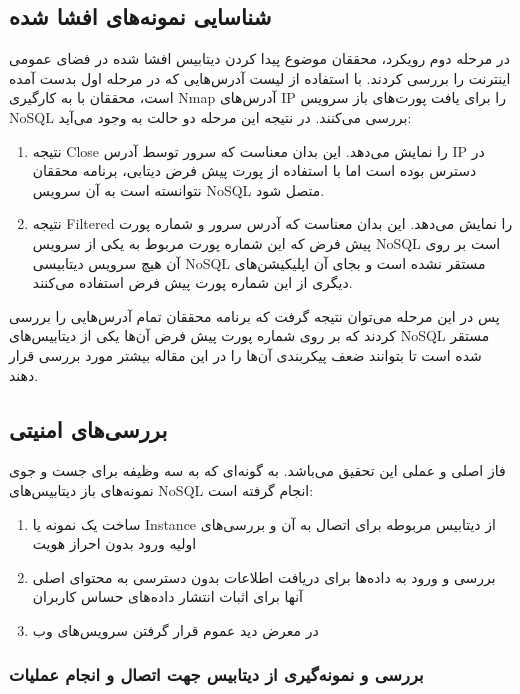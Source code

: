 \documentclass[10pt, a4paper]{article}
\begin{document}
\subsection{شناسایی نمونه‌های افشا شده}

در مرحله دوم رویکرد، محققان موضوع پیدا کردن دیتابیس افشا شده در فضای عمومی
اینترنت را بررسی کردند. با استفاده از لیست آدرس‌هایی که در مرحله اول بدست آمده
است، محققان با به کارگیری Nmap آدرس‌های IP را برای یافت پورت‌های باز سرویس NoSQL
بررسی می‌کنند. در نتیجه این مرحله دو حالت به وجود می‌آید:

\begin{enumerate}
    \item نتیجه Close را نمایش می‌دهد. این بدان معناست که سرور توسط آدرس IP در
    دسترس بوده است اما با استفاده از پورت پیش فرض دیتابی، برنامه محققان نتوانسته
    است به آن سرویس NoSQL متصل شود.
    \item نتیجه Filtered را نمایش می‌دهد. این بدان معناست که آدرس سرور و شماره
    پورت پیش فرض که این شماره پورت مربوط به یکی از سرویس NoSQL است بر روی آن هیچ
    سرویس دیتابیسی NoSQL مستقر نشده است و بجای آن اپلیکیشن‌های دیگری از این
    شماره پورت پیش فرض استفاده می‌کنند.
\end{enumerate}

پس در این مرحله می‌توان نتیجه گرفت که برنامه محققان تمام آدرس‌هایی را بررسی
کردند که بر روی شماره پورت پیش فرض آن‌ها یکی از دیتابیس‌های NoSQL مستقر شده است
تا بتوانند ضعف پیکربندی آن‌ها را در این مقاله بیشتر مورد بررسی قرار دهند.

\newpage

\subsection{بررسی‌های امنیتی}

فاز اصلی و عملی این تحقیق می‌باشد. به گونه‌ای که به سه وظیفه برای جست و جوی
نمونه‌های باز دیتابیس‌های NoSQL انجام گرفته است:

\begin{enumerate}
    \item ساخت یک نمونه یا Instance از دیتابیس مربوطه برای اتصال به آن و
    بررسی‌های اولیه ورود بدون احراز هویت
    \item بررسی و ورود به داده‌ها برای دریافت اطلاعات بدون دسترسی به محتوای اصلی
    آنها برای اثبات انتشار داده‌های حساس کاربران
    \item در معرض دید عموم قرار گرفتن سرویس‌های وب
\end{enumerate}


\subsubsection*{بررسی و نمونه‌گیری از دیتابیس جهت اتصال و انجام عملیات}
\end{document}

